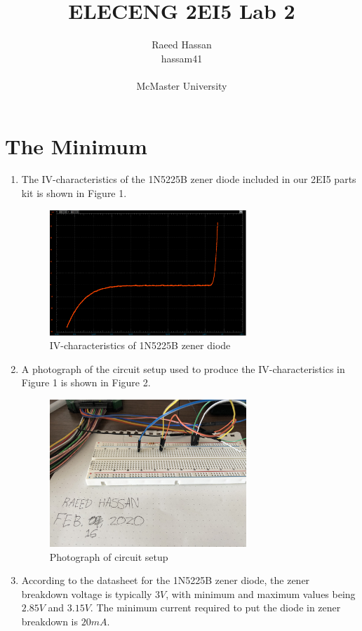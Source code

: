 \documentclass[12pt]{article}
\title{ELECENG 2EI5 Lab 2}
\author{Raeed Hassan \\ hassam41 \\  \\ McMaster University}
\begin{document}
\maketitle
\pagebreak

\section*{The Minimum}
\begin{enumerate}
    \item The IV-characteristics of the 1N5225B zener diode included in our 2EI5 parts kit is shown in Figure 1.
    \begin{figure}[h!]
        \centering
        \includegraphics[width=0.7\textwidth]{A1.png}
        \caption{IV-characteristics of 1N5225B zener diode}
    \end{figure}
    \item A photograph of the circuit setup used to produce the IV-characteristics in Figure 1 is shown in Figure 2.
    \begin{figure}[h!]
        \centering
        \includegraphics[width=0.7\textwidth]{A2.png}
        \caption{Photograph of circuit setup}
    \end{figure}
    \item According to the datasheet for the 1N5225B zener diode, the zener breakdown voltage is typically $3V$, with minimum and maximum values being $2.85V$ and $3.15V$. The minimum current required to put the diode in zener breakdown is $20mA$.

\end{enumerate}
\end{document}
